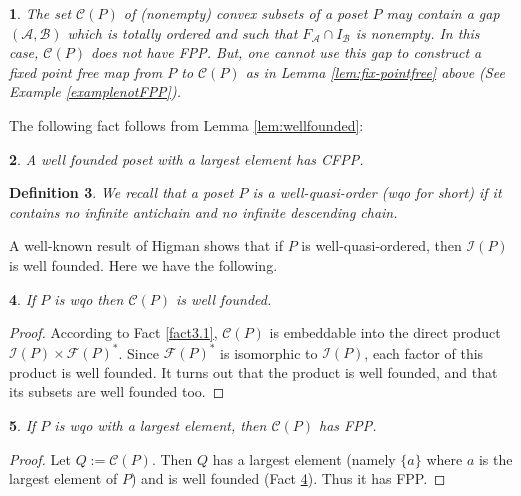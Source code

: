 \documentclass[12pt]{amsart}
\newtheorem{definition}{{\bf Definition}}[section]
\newtheorem{lemma}[definition]{\noindent {\bf Lemma}}
\newtheorem{remark}[definition]{\noindent {\bf Remark}}\newtheorem{problem}[definition]{\noindent {\bf Problem}}
\newtheorem{fact}[definition]{\noindent {\bf Fact}}
\begin{document}
\begin{remark} 
The set $\mathcal C (P)$ of (nonempty) convex subsets of a poset $P$ may
contain a gap $(\mathcal A,\mathcal B)$ which is totally ordered and
such that $F_{\mathcal A}\cap I_{\mathcal B}$ is nonempty. In this
case, $\mathcal C (P)$ does not have FPP.  But, one cannot use this gap to
construct a fixed point free map from $P$ to $\mathcal C (P)$ as in
Lemma \ref{lem:fix-pointfree} above (See Example
\ref{examplenotFPP}). 
\end{remark}

\medskip

The following fact follows from Lemma \ref{lem:wellfounded}:

\begin{fact} \label{wellfounded}
A well founded poset with a largest element has  CFPP.
\end{fact}

\medskip

\begin{definition}
We recall that a poset $P$ is a \emph{well-quasi-order} (wqo for
short) if it contains no infinite antichain and no infinite descending
chain. 
\end{definition}

A well-known result of Higman \cite{higman} shows that if $P$ is
well-quasi-ordered, then $\mathcal {I}(P)$ is well founded. Here we
have the following.

\begin{fact}\label{fact:wqo} 
If $P$ is wqo then $\mathcal C (P)$ is well founded.
\end{fact}

\begin{proof} 
According to Fact \ref{fact3.1}, $\mathcal C (P)$ is embeddable
into the direct product $\mathcal{I}(P)\times \mathcal
F(P)^{*}$. Since $\mathcal F(P)^{*}$ is isomorphic to
$\mathcal{I}(P)$, each factor of this product is well founded. It
turns out that the product is well founded, and that its subsets are
well founded too.
\end{proof}

\begin{lemma}\label{lem: wqo+C(P)} 
If $P$ is wqo with a  largest element, then $\mathcal C (P)$ has FPP. 
\end{lemma}

\begin{proof} 
Let $Q:= \mathcal C (P)$. Then $Q$ has a largest element (namely
$\{a\}$ where $a$ is the largest element of $P$) and is well founded
(Fact \ref{fact:wqo}). Thus it has FPP.
\end{proof}
\end{document}
